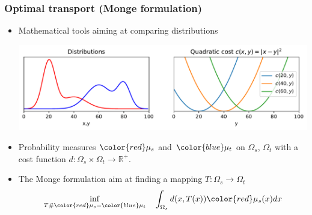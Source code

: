 \documentclass[french,9pt]{beamer}
\newcommand{\red}[1]{{\color{red} #1}}
\newcommand{\blue}[1]{{\color{blue} #1}}
\begin{document}
\begin{frame}
  \frametitle{Optimal transport (Monge formulation)}

  \begin{itemize}
  \item Mathematical tools aiming at comparing distributions
    \begin{center}
\includegraphics[width=0.9\linewidth]{./fig/dist_monge.pdf}  
\end{center}

  \item Probability measures $\red{\mu_s}$ and $\blue{\mu_{t}}$ on $\Omega_s$, $\Omega_t$    
    with a cost function
    $d: \Omega_{s} \times \Omega_{t} \rightarrow \mathbb{R}^{+}$.

  \item The Monge formulation aim at finding a mapping
    $T:\Omega_{s}\rightarrow \Omega_{t}$
    \begin{equation}
      \label{eq:1}
      \inf_{T\#\red{\mu_{s}}=\blue{\mu_{t}}}\quad\int_{\Omega_{s}} d(x,T(x))\red{\mu_{s}}(x)dx
    \end{equation}

  \end{itemize}
  

\end{frame}
\end{document}
